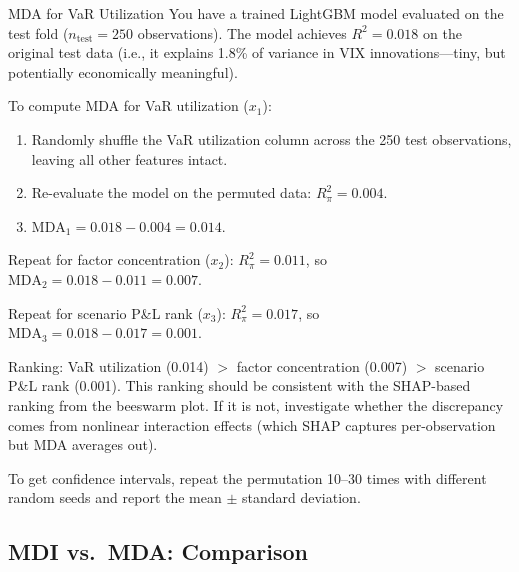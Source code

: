 \begin{workedexample}{MDA for VaR Utilization}
You have a trained LightGBM model evaluated on the test fold ($n_{\text{test}} = 250$ observations).
The model achieves $R^2 = 0.018$ on the original test data (i.e., it explains 1.8\% of variance in VIX innovations---tiny, but potentially economically meaningful).

To compute MDA for VaR utilization ($x_1$):
\begin{enumerate}[nosep]
  \item Randomly shuffle the VaR utilization column across the 250 test observations, leaving all other features intact.
  \item Re-evaluate the model on the permuted data: $R^2_{\pi} = 0.004$.
  \item $\mathrm{MDA}_1 = 0.018 - 0.004 = 0.014$.
\end{enumerate}

Repeat for factor concentration ($x_2$): $R^2_{\pi} = 0.011$, so $\mathrm{MDA}_2 = 0.018 - 0.011 = 0.007$.

Repeat for scenario P\&L rank ($x_3$): $R^2_{\pi} = 0.017$, so $\mathrm{MDA}_3 = 0.018 - 0.017 = 0.001$.

Ranking: VaR utilization (0.014) $>$ factor concentration (0.007) $>$ scenario P\&L rank (0.001).
This ranking should be consistent with the SHAP-based ranking from the beeswarm plot.
If it is not, investigate whether the discrepancy comes from nonlinear interaction effects (which SHAP captures per-observation but MDA averages out).

To get confidence intervals, repeat the permutation 10--30 times with different random seeds and report the mean $\pm$ standard deviation.
\end{workedexample}

\subsection{MDI vs.\ MDA: Comparison}

